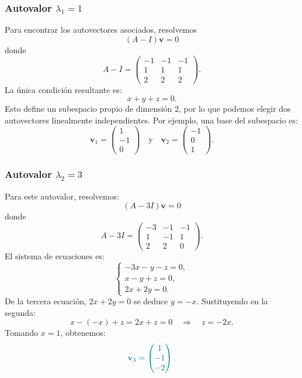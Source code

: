 \documentclass{article}
\begin{document}
\begin{enumerate}[label=\textbf{\alph*)}]
    \subsubsection*{Autovalor \( \lambda_1 = 1 \)}
    
    Para encontrar los autovectores asociados, resolvemos
    \[
    (A - I)\mathbf{v} = 0
    \]
    donde
    \[
    A - I =
    \begin{pmatrix}
    -1 & -1 & -1 \\
    1 & 1 & 1 \\
    2 & 2 & 2
    \end{pmatrix}.
    \]
    La única condición resultante es:
    \[
    x + y + z = 0.
    \]
    Esto define un subespacio propio de dimensión 2, por lo que podemos elegir dos autovectores linealmente independientes. Por ejemplo, una base del subespacio es:
    \[
    \mathbf{v}_1 = \begin{pmatrix} 1 \\ -1 \\ 0 \end{pmatrix} \quad \text{y} \quad \mathbf{v}_2 = \begin{pmatrix} -1 \\ 0 \\ 1 \end{pmatrix}.
    \]
    
    \subsubsection*{Autovalor \( \lambda_2 = 3 \)}
    
    Para este autovalor, resolvemos:
    \[
    (A - 3I)\mathbf{v} = 0
    \]
    donde
    \[
    A - 3I =
    \begin{pmatrix}
    -3 & -1 & -1 \\
    1 & -1 & 1 \\
    2 & 2 & 0
    \end{pmatrix}.
    \]
    El sistema de ecuaciones es:
    \[
    \begin{cases}
    -3x - y - z = 0, \\
    x - y + z = 0, \\
    2x + 2y = 0.
    \end{cases}
    \]
    De la tercera ecuación, \( 2x + 2y = 0 \) se deduce \( y = -x \). Sustituyendo en la segunda:
    \[
    x - (-x) + z = 2x + z = 0 \quad \Rightarrow \quad z = -2x.
    \]
    Tomando \( x = 1 \), obtenemos:
    \[\color{teal}
    \mathbf{v}_3 = \begin{pmatrix} 1 \\ -1 \\ -2 \end{pmatrix}.
    \]
    

\end{enumerate}
\end{document}
